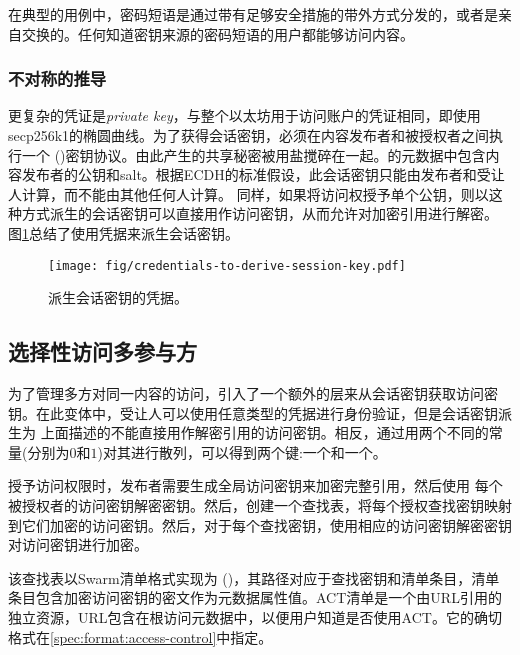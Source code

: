 在典型的用例中，密码短语是通过带有足够安全措施的带外方式分发的，或者是亲自交换的。任何知道密钥来源的密码短语的用户都能够访问内容。

\subsubsection{不对称的推导}

更复杂的凭证是\emph{private key}，与整个以太坊用于访问账户的凭证相同，即使用secp256k1的椭圆曲线。为了获得会话密钥，必须在内容发布者和被授权者之间执行一个 ()密钥协议。由此产生的共享秘密被用盐搅碎在一起。的元数据中包含内容发布者的公钥和salt。根据ECDH的标准假设，此会话密钥只能由发布者和受让人计算，而不能由其他任何人计算。 
同样，如果将访问权授予单个公钥，则以这种方式派生的会话密钥可以直接用作访问密钥，从而允许对加密引用进行解密。
图\ref{fig:credentials-to-derive-session-key}总结了使用凭据来派生会话密钥。

\begin{figure}[htbp]
\centering
\texttt{[image: fig/credentials-to-derive-session-key.pdf]}
\caption[派生会话密钥的凭据\statusyellow]{派生会话密钥的凭据。}
\label{fig:credentials-to-derive-session-key}
\end{figure}


\subsection{选择性访问多参与方\statusgreen}

为了管理多方对同一内容的访问，引入了一个额外的层来从会话密钥获取访问密钥。在此变体中，受让人可以使用任意类型的凭据进行身份验证，但是会话密钥派生为
上面描述的不能直接用作解密引用的访问密钥。相反，通过用两个不同的常量(分别为$0$和$1$)对其进行散列，可以得到两个键:一个和一个。

授予访问权限时，发布者需要生成全局访问密钥来加密完整引用，然后使用
每个被授权者的访问密钥解密密钥。然后，创建一个查找表，将每个授权查找密钥映射到它们加密的访问密钥。然后，对于每个查找密钥，使用相应的访问密钥解密密钥对访问密钥进行加密。

该查找表以Swarm清单格式实现为 ()，其路径对应于查找密钥和清单条目，清单条目包含加密访问密钥的密文作为元数据属性值。ACT清单是一个由URL引用的独立资源，URL包含在根访问元数据中，以便用户知道是否使用ACT。它的确切格式在\ref{spec:format:access-control}中指定。

